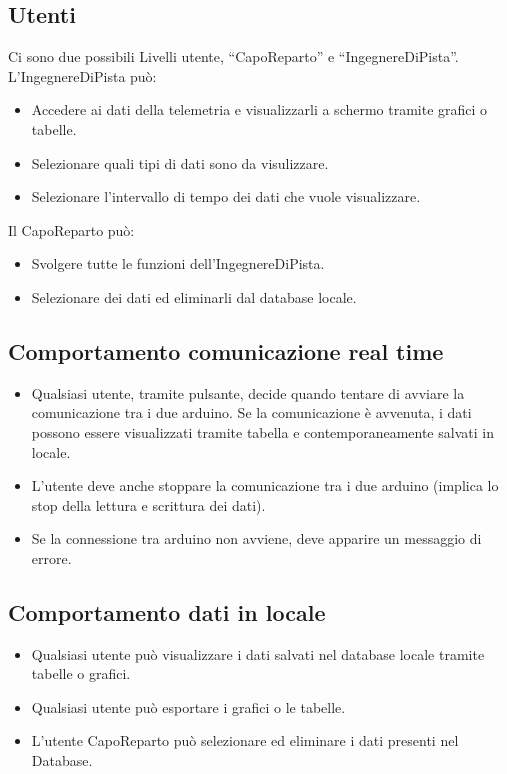 \documentclass{report}
\begin{document}
\subsection{Utenti}
Ci sono due possibili Livelli utente, “CapoReparto” e “IngegnereDiPista”.\\

L'IngegnereDiPista può:\\
\begin{itemize}
\item Accedere ai dati della telemetria e visualizzarli a schermo tramite grafici o tabelle.
\item Selezionare quali tipi di dati sono da visulizzare.
\item Selezionare l’intervallo di tempo dei dati che vuole visualizzare.\\
\end{itemize}

Il CapoReparto può:
\begin{itemize}
\item Svolgere tutte le funzioni dell’IngegnereDiPista.
\item Selezionare dei dati ed eliminarli dal database locale.
\end{itemize}

\subsection{Comportamento comunicazione real time}
\begin{itemize}
\item Qualsiasi utente, tramite pulsante, decide quando tentare di avviare la comunicazione tra i due arduino.
Se la comunicazione è avvenuta, i dati possono essere visualizzati tramite tabella e contemporaneamente salvati in locale.
\item L’utente deve anche stoppare la comunicazione tra i due arduino (implica lo stop della lettura e scrittura dei dati).
\item Se la connessione tra arduino non avviene, deve apparire un messaggio di errore.
\end{itemize}

\subsection{Comportamento dati in locale}
\begin{itemize}
\item Qualsiasi utente può visualizzare i dati salvati nel database locale tramite tabelle o grafici.
\item Qualsiasi utente può esportare i grafici o le tabelle.
\item L’utente CapoReparto può selezionare ed eliminare i dati presenti nel Database.
\end{itemize}
\end{document}
